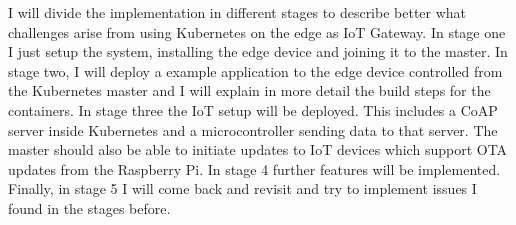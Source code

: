 I will divide the implementation in different stages to describe better what challenges arise from using Kubernetes on the edge as IoT Gateway. In stage one I just setup the system, installing the edge device and joining it to the master. In stage two, I will deploy a example application to the edge device controlled from the Kubernetes master and I will explain in more detail the build steps for the containers. In stage three the IoT setup will be deployed. This includes a CoAP server inside Kubernetes and a microcontroller sending data to that server. The master should also be able to initiate updates to IoT devices which support OTA updates from the Raspberry Pi. In stage 4 further features will be implemented. Finally, in stage 5 I will come back and revisit and try to implement issues I found in the stages before.\\


% 
% 








